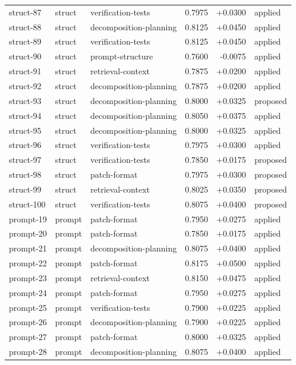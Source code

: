 \begin{center}
\begin{longtable}{llp{5.2cm}rrl}
struct-87 & struct & verification-tests & 0.7975 & +0.0300 & applied \\
struct-88 & struct & decomposition-planning & 0.8125 & +0.0450 & applied \\
struct-89 & struct & verification-tests & 0.8125 & +0.0450 & applied \\
struct-90 & struct & prompt-structure & 0.7600 & -0.0075 & applied \\
struct-91 & struct & retrieval-context & 0.7875 & +0.0200 & applied \\
struct-92 & struct & decomposition-planning & 0.7875 & +0.0200 & applied \\
struct-93 & struct & decomposition-planning & 0.8000 & +0.0325 & proposed \\
struct-94 & struct & decomposition-planning & 0.8050 & +0.0375 & applied \\
struct-95 & struct & decomposition-planning & 0.8000 & +0.0325 & applied \\
struct-96 & struct & verification-tests & 0.7975 & +0.0300 & applied \\
struct-97 & struct & verification-tests & 0.7850 & +0.0175 & proposed \\
struct-98 & struct & patch-format & 0.7975 & +0.0300 & proposed \\
struct-99 & struct & retrieval-context & 0.8025 & +0.0350 & proposed \\
struct-100 & struct & verification-tests & 0.8075 & +0.0400 & proposed \\
prompt-19 & prompt & patch-format & 0.7950 & +0.0275 & applied \\
prompt-20 & prompt & patch-format & 0.7850 & +0.0175 & applied \\
prompt-21 & prompt & decomposition-planning & 0.8075 & +0.0400 & applied \\
prompt-22 & prompt & patch-format & 0.8175 & +0.0500 & applied \\
prompt-23 & prompt & retrieval-context & 0.8150 & +0.0475 & applied \\
prompt-24 & prompt & patch-format & 0.7950 & +0.0275 & applied \\
prompt-25 & prompt & verification-tests & 0.7900 & +0.0225 & applied \\
prompt-26 & prompt & decomposition-planning & 0.7900 & +0.0225 & applied \\
prompt-27 & prompt & patch-format & 0.8000 & +0.0325 & applied \\
prompt-28 & prompt & decomposition-planning & 0.8075 & +0.0400 & applied \\

\end{longtable}
\end{center}
